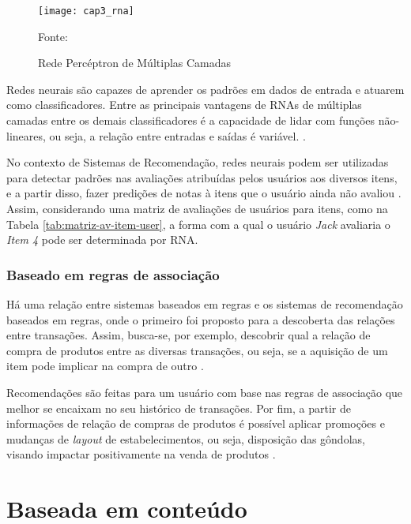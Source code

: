         \begin{figure}[htb]        
            \caption{Rede Percéptron de Múltiplas Camadas}
            \texttt{[image: cap3\_rna]}
            \label{fig:cap3_rna}
            
            \footnotesize{Fonte: }
        \end{figure}
        
        Redes neurais são capazes de aprender os padrões em dados de entrada e atuarem como classificadores. Entre as principais vantagens de RNAs de múltiplas camadas entre os demais classificadores é a capacidade de lidar com funções não-lineares, ou seja, a relação entre entradas e saídas é variável. \cite{Aggarwal2016}.
        
        No contexto de Sistemas de Recomendação, redes neurais podem ser utilizadas para detectar padrões nas avaliações atribuídas pelos usuários aos diversos itens, e a partir disso, fazer predições de notas à itens que o usuário ainda não avaliou \cite{Ricci2010}. Assim, considerando uma matriz de avaliações de usuários para itens, como na Tabela \ref{tab:matriz-av-item-user}, a forma com a qual o usuário \textit{Jack} avaliaria o \textit{Item 4} pode ser determinada por RNA.
                  
        \subsubsection{Baseado em regras de associação}
        
        Há uma relação entre sistemas baseados em regras e os sistemas de recomendação baseados em regras, onde o primeiro foi proposto para a descoberta das relações entre transações. Assim, busca-se, por exemplo, descobrir qual a relação de compra de produtos entre as diversas transações, ou seja, se a aquisição de um item pode implicar na compra de outro \cite{Aggarwal2016}.  
        
        Recomendações são feitas para um usuário com base nas regras de associação que melhor se encaixam no seu histórico de transações.
        Por fim, a partir de informações de relação de compras de produtos é possível aplicar promoções e mudanças de \textit{layout} de estabelecimentos, ou seja, disposição das gôndolas, visando impactar positivamente na venda de produtos \cite{Jannach2010}.
            
\section{Baseada em conteúdo}

